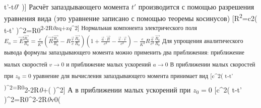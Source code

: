 \documentclass[11pt]{article}
\begin{document}
t'-{{t}\emph{{0}}' \right){]} Расчёт запаздывающего момента \(t'\)
производится с помощью разрешения уравнения вида (это уравнение записано
с помощью теоремы косинусов)
{[}{{R}\textsuperscript{{2}}={{c}}{2}}{{\left( t-t'
\right)}^{2}}={{R}}{0}}\textsuperscript{{2}-2{{R}\emph{{0}}{{z}}{q}}\cos \theta +{{z}\emph{{q}}^{2}{]}
Нормальная компонента электрического поля
\({{E}_{n}}=\overrightarrow{E}\frac{\overrightarrow{{{R}_{0}}}}{{{R}_{0}}}=\frac{e}{{{K}^{3}}}\left( \overrightarrow{R}\frac{\overrightarrow{{{R}_{0}}}}{{{R}_{0}}}-R\frac{\overrightarrow{v}}{c}\frac{\overrightarrow{{{R}_{0}}}}{{{R}_{0}}} \right)\left( 1+\frac{\overrightarrow{a}\cdot \overrightarrow{R}}{{{c}^{2}}}-\frac{\overrightarrow{v}\cdot \overrightarrow{v}}{{{c}^{2}}} \right)-\frac{e}{{{K}^{2}}}R\frac{\overrightarrow{a}}{{{c}^{2}}}\frac{\overrightarrow{{{R}_{0}}}}{{{R}_{0}}}\)
Для упрощения аналитического вывода формулы запаздывающего момента можно
применить два приближения: приближение малых скоростей \(v\to 0\) и
приближение малых ускорений \(a\to 0\) В приближении малых скоростей при
\({{z}_{0}}=0\) уравнение для вычисления запаздывающего момента
принимает вид {[}{{c}^{2}}{{\left( t-t'
\right)}^{2}}={{R}}{0}}}{2}-2{{R}\emph{{0}}\cos \theta +{{\left(
\right)}^{2}}{]} А в приближении малых ускорений при
\({{z}_{0}}=0\) {[}{{c}^{2}}{{\left( t-t'
\right)}^{2}}={{R}}{0}}^{2}-2{{R}\emph{{0}}{{v}}{0}}\left(
\end{document}
